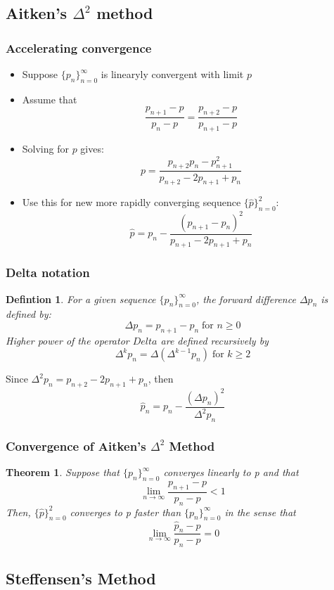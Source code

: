 \documentclass[12pt]{article}
\newtheorem{theorem}{Theorem}[subsection]
\newtheorem*{definition}{Defintion}
\begin{document}
\subsection{Aitken's $\Delta^2$ method}
\subsubsection{Accelerating convergence}
\begin{itemize}
	\item Suppose $\{p_n\}_{n=0}^{\infty}$ is linearyly convergent with limit $p$
	\item Assume that $$\frac{p_{n+1}-p}{p_n -p} = \frac{p_{n+2}-p}{p_{n+1} -p}$$
	\item Solving for $p$ gives: $$p = \frac{p_{n+2}p_n-p_{n+1}^2}{p_{n+2} -2p_{n+1}+p_n}$$
	\item Use this for new more rapidly converging sequence $\{\hat{p}\}_{n=0}^2$: $$\hat{p} = p_n -\frac{(p_{n+1} -p_n)^2}{p_{n+1} -2p_{n+1} +p_n}$$
\end{itemize}

\subsubsection{Delta notation}
\begin{definition}
	For a given sequence $\{p_n\}_{n=0}^{\infty}$, the forward difference $\Delta p_n$ is defined by:
	$$\Delta p_n = p_{n+1} - p_n \; \text{for $n \geq 0$}$$
	Higher power of the operator $Delta$ are defined recursively by $$\Delta^kp_n = \Delta(\Delta^{k-1}p_n) \; \text{for $k \geq 2$}$$
	\end{definition}
Since $\Delta^2p_n = p_{n+2} -2p_{n+1} + p_n$, then $$\hat{p}_n = p_n - \frac{(\Delta p_n)^2}{\Delta^2 p_n}$$
\subsubsection{Convergence of Aitken's $\Delta^2$ Method}
\begin{theorem}
Suppose that $\{p_n\}_{n=0}^{\infty}$ converges linearly to p and that $$\lim_{n \to \infty} \frac{p_{n+1} - p}{p_n - p} <1$$
Then,  	$\{\hat{p}\}_{n=0}^2$ converges to p faster than $\{p_n\}_{n=0}^{\infty}$ in the sense that 
$$\lim_{n \to \infty}\frac{\hat{p}_n -p}{p_n - p} = 0$$
\end{theorem}


\subsection{Steffensen's Method}
\end{document}
